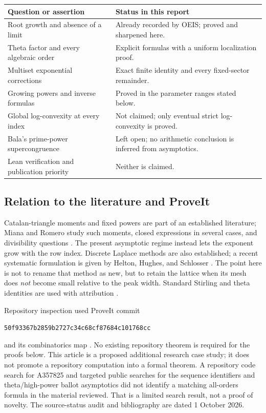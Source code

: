 \documentclass[11pt,a4paper]{article}
\numberwithin{equation}{section}
\theoremstyle{definition}
\begin{document}
\begin{center}
\small
\begin{tabular}{@{}p{}p{}@{}}
\toprule
Question or assertion & Status in this report\\
\midrule
Root growth and absence of a limit & Already recorded by OEIS; proved and sharpened here.\\
Theta factor and every algebraic order & Explicit formulas with a uniform localization proof.\\
Multiset exponential corrections & Exact finite identity and every fixed-sector remainder.\\
Growing powers and inverse formulas & Proved in the parameter ranges stated below.\\
Global log-convexity at every index & Not claimed; only eventual strict log-convexity is proved.\\
Bala's prime-power supercongruence & Left open; no arithmetic conclusion is inferred from asymptotics.\\
Lean verification and publication priority & Neither is claimed.\\
\bottomrule
\end{tabular}
\end{center}

\subsection{Relation to the literature and ProveIt}
Catalan-triangle moments and fixed powers are part of an established
literature; Miana and Romero study such moments, closed expressions in
several cases, and divisibility questions \cite{miana}. The present
asymptotic regime instead lets the exponent grow with the row index.
Discrete Laplace methods are also established; a recent systematic
formulation is given by Helton, Hughes, and Schlosser \cite{discretelaplace}.
The point here is not to rename that method as new, but to retain the
lattice when its mesh does \emph{not} become small relative to the peak
width. Standard Stirling and theta identities are used with attribution
\cite{dlmfgamma,dlmfpolygamma,dlmftheta,dlmftransform}.

Repository inspection used ProveIt commit
\begin{center}\small\texttt{50f93367b2859b2727c34c68cf87684c101768cc}\end{center}
and its combinatorics map \cite{proveit}. No existing repository theorem is required for the
proofs below. This article is a proposed additional research case study;
it does not promote a repository computation into a formal theorem.
A repository code search for A357825 and targeted public searches for the
sequence identifiers and theta/high-power ballot asymptotics did not
identify a matching all-orders formula in the material reviewed. That is
a limited search result, not a proof of novelty. The source-status audit
and bibliography are dated 1 October 2026.
\end{document}
